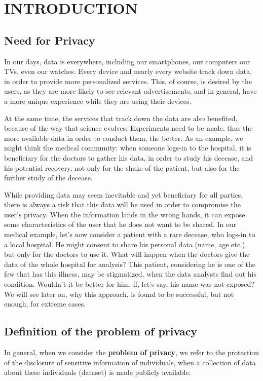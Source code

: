 \chapter{INTRODUCTION}

\section{Need for Privacy}


\par In our days, data is everywhere, including our smartphones, our computers our TVs, even our watches. Every device and nearly every website track down data, in order to provide more personalized services. This, of course, is desired by the users, as they are more likely to see relevant advertisements, and in general, have a more unique experience while they are using their devices.

\par At the same time, the services that track down the data are also benefited, because of the way that science evolves: Experiments need to be made, thus the more available data in order to conduct them, the better. As an example, we might think the medical community: when someone logs-in to the hospital, it is beneficiary for the doctors to gather his data, in order to study his decease, and his potential recovery, not only for the shake of the patient, but also for the further study of the decease. 

\par While providing data may seem inevitable and yet beneficiary for all parties, there is always a risk that this data will be used in order to compromise the user's privacy. When the information lands in the wrong hands, it can expose some characteristics of the user that he does not want to be shared. In our medical example, let's now consider a patient with a rare decease, who logs-in to a local hospital. He might consent to share his personal data (name, age etc.), but only for the doctors to use it. What will happen when the doctors give the data of the whole hospital for analysis? This patient, considering he is one of the few that has this illness, may be stigmatized,  when the data analysts find out his condition. Wouldn't it be better for him, if, let's say, his name was not exposed? We will see later on, why this approach, is found to be successful, but not enough, for extreme cases.

\section{Definition of the problem of privacy}
\par In general, when we consider the \textbf{problem of privacy}, we refer to the protection of the disclosure of sensitive information of individuals, when a collection of data about these individuals (dataset) is made publicly available.

